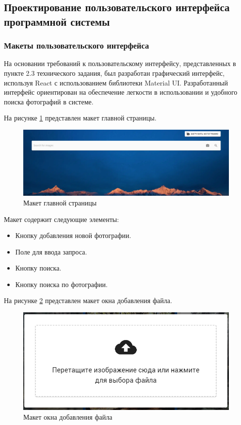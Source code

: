 \subsection{Проектирование пользовательского интерфейса программной системы}
\subsubsection{Макеты пользовательского интерфейса}

На основании требований к пользовательскому интерфейсу, представленных в пункте 2.3 технического задания, был разработан графический интерфейс, используя React с использованием библиотеки Material UI. Разработанный интерфейс ориентирован на обеспечение легкости в использовании и удобного поиска фотографий в системе.

На рисунке \ref{fig:homepage} представлен макет главной страницы.

\begin{figure}
	\centering
	\includegraphics[width=0.95\linewidth]{"images/Главная страница"}
	\caption{Макет главной страницы}
	\label{fig:homepage}
\end{figure}

Макет содержит следующие элементы:
\begin{itemize}
	\item Кнопку добавления новой фотографии.
	\item Поле для ввода запроса.
	\item Кнопку поиска.
	\item Кнопку поиска по фотографии.
\end{itemize}

На рисунке \ref{fig:uploadPage} представлен макет окна добавления файла.
\begin{figure}
	\centering
	\includegraphics[width=0.95\linewidth]{"images/Окно добавления файла"}
	\caption{Макет окна добавления файла}
	\label{fig:uploadPage}
\end{figure}

